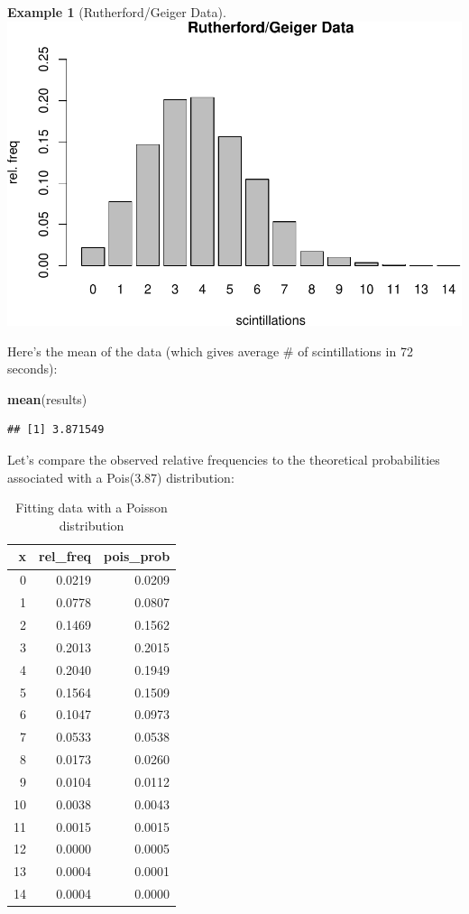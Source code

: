 \documentclass[
]{book}
\newenvironment{Shaded}{\begin{snugshade}}{\end{snugshade}}
\newcommand{\FunctionTok}[1]{\textcolor[rgb]{0.13,0.29,0.53}{\textbf{#1}}}
\newcommand{\NormalTok}[1]{#1}
\theoremstyle{definition}
\theoremstyle{definition}
\newtheorem{example}{Example}[chapter]
\theoremstyle{definition}
\theoremstyle{definition}
\theoremstyle{remark}
\begin{document}
\begin{example}[Rutherford/Geiger Data]
\includegraphics{math340-notes_files/figure-latex/unnamed-chunk-167-1.pdf}

Here's the mean of the data (which gives average \# of scintillations in 72 seconds):

\begin{Shaded}
\begin{Highlighting}[]
\FunctionTok{mean}\NormalTok{(results)}
\end{Highlighting}
\end{Shaded}

\begin{verbatim}
## [1] 3.871549
\end{verbatim}

Let's compare the observed relative frequencies to the theoretical probabilities associated with a Pois(3.87) distribution:

\begin{table}
\centering
\caption{\label{tab:unnamed-chunk-169}Fitting data with a Poisson distribution}
\centering
\begin{tabular}[t]{r|r|r}
\hline
x & rel\_freq & pois\_prob\\
\hline
0 & 0.0219 & 0.0209\\
\hline
1 & 0.0778 & 0.0807\\
\hline
2 & 0.1469 & 0.1562\\
\hline
3 & 0.2013 & 0.2015\\
\hline
4 & 0.2040 & 0.1949\\
\hline
5 & 0.1564 & 0.1509\\
\hline
6 & 0.1047 & 0.0973\\
\hline
7 & 0.0533 & 0.0538\\
\hline
8 & 0.0173 & 0.0260\\
\hline
9 & 0.0104 & 0.0112\\
\hline
10 & 0.0038 & 0.0043\\
\hline
11 & 0.0015 & 0.0015\\
\hline
12 & 0.0000 & 0.0005\\
\hline
13 & 0.0004 & 0.0001\\
\hline
14 & 0.0004 & 0.0000\\
\hline
\end{tabular}
\end{table}


\end{example}
\end{document}
